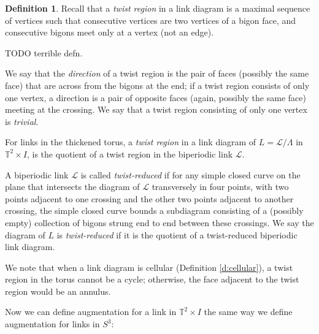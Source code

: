 \documentclass[11pt]{amsart}
\newcommand{\Sp}{{S}}
\newcommand{\torus}{{\mathbb{T}^2}}
\theoremstyle{plain}
\theoremstyle{definition}
\newtheorem{define}[theorem]{Definition}
\begin{document}
\begin{define}
Recall that a \emph{twist region}
in a link diagram is a maximal sequence of vertices
such that consecutive vertices are two vertices of a bigon face,
and consecutive bigons meet only at a vertex (not an edge).

TODO terrible defn.

We say that the \emph{direction} of a twist region
is the pair of faces (possibly the same face)
that are across from the bigons at the end;
if a twist region consists of only one vertex,
a direction is a pair of opposite faces (again, possibly the same face)
meeting at the crossing.
We say that a twist region consisting of only one vertex
is \emph{trivial}.


For links in the thickened torus,
a \emph{twist region} in a link diagram of $L=\mathcal{L}/\Lambda$ in $\torus
\times I$, is the quotient of a twist region in the biperiodic link
$\mathcal{L}$. 


A biperiodic link
$\mathcal{L}$ is called \emph{twist-reduced} if for any simple closed curve on
the plane that intersects the diagram of $\mathcal{L}$
transversely in four points, with two
points adjacent to one crossing and the other two points adjacent to another
crossing, the simple closed curve bounds a subdiagram consisting of a (possibly
empty) collection of bigons strung end to end between these crossings. We say
the diagram of $L$ is \emph{twist-reduced}
if it is the quotient of a twist-reduced biperiodic
link diagram.
\end{define}


We note that when a link diagram is cellular
(Definition \ref{d:cellular}),
a twist region in the torus cannot be a cycle;
otherwise, the face adjacent to the twist region would be an annulus.


Now we can define augmentation for a link in $\torus \times I$ the same way we
define augmentation for links in $\Sp^3$:
\end{document}
